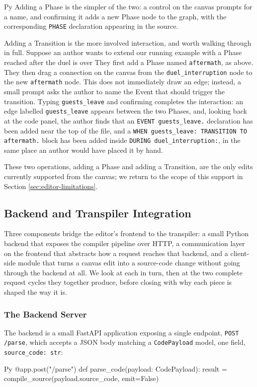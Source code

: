 \begin{codeblock}[]{Py}
Adding a Phase is the simpler of the two: a control on the canvas prompts for a name, and confirming it adds a new Phase node to the graph, with the corresponding \lstinline|PHASE| declaration appearing in the source.

Adding a Transition is the more involved interaction, and worth walking through in full. Suppose an author wants to extend our running example with a Phase reached after the duel is over They first add a Phase named \lstinline|aftermath|, as above. They then drag a connection on the canvas from the \lstinline|duel_interruption| node to the new \lstinline|aftermath| node. This does not immediately draw an edge; instead, a small prompt asks the author to name the Event that should trigger the transition. Typing \lstinline|guests_leave| and confirming completes the interaction: an edge labelled \lstinline|guests_leave| appears between the two Phases, and, looking back at the code panel, the author finds that an \lstinline|EVENT guests_leave.| declaration has been added near the top of the file, and a \lstinline|WHEN guests_leave: TRANSITION TO aftermath.| block has been added inside \lstinline|DURING duel_interruption:|, in the same place an author would have placed it by hand.

These two operations, adding a Phase and adding a Transition, are the only edits currently supported from the canvas; we return to the scope of this support in Section \ref{sec:editor-limitations}.

\subsection{Backend and Transpiler Integration}
\label{sec:editor-backend}
Three components bridge the editor's frontend to the transpiler: a small Python backend that exposes the compiler pipeline over HTTP, a communication layer on the frontend that abstracts how a request reaches that backend, and a client-side module that turns a canvas edit into a source-code change without going through the backend at all. We look at each in turn, then at the two complete request cycles they together produce, before closing with why each piece is shaped the way it is.

\subsubsection{The Backend Server}
The backend is a small FastAPI application exposing a single endpoint, \lstinline|POST /parse|, which accepts a JSON body matching a \lstinline|CodePayload| model, one field, \lstinline|source_code: str|:
\begin{codeblock}[]{Py}
@app.post("/parse")
def parse_code(payload: CodePayload):
    result = compile_source(payload.source_code, emit=False)


\end{codeblock}
\end{codeblock}
